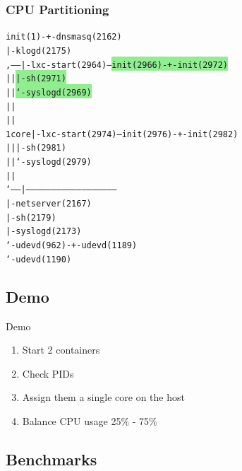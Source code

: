 \begin{frame}[fragile]
\frametitle{CPU Partitioning}
\begin{alltt}\footnotesize
init(1)-+-dnsmasq(2162)
        |-klogd(2175)       
  ,-----|-lxc-start(2964)---\colorbox{LightGreen}{init(2966)-+-init(2972)    }
  |     |                \colorbox{LightGreen}{              |-sh(2971)      }
  |     |                   \colorbox{LightGreen}{              `-syslogd(2969) }
  |     |                   
  |     |                   
1 core  |-lxc-start(2974)---\colorbox{LightRed}{init(2976)-+-init(2982)    }
  |     |                \colorbox{LightRed}{              |-sh(2981)      }
  |     |                   \colorbox{LightRed}{              `-syslogd(2979) }
  |     |                   
  `-----|-----------------------------------------------------
        |-netserver(2167)
        |-sh(2179)
        |-syslogd(2173)
        `-udevd(962)-+-udevd(1189)
                     `-udevd(1190)
\end{alltt}\normalsize
\end{frame}

\subsection{Demo}

\begin{frame}{Demo}
\begin{enumerate}
\item Start 2 containers
\item Check PIDs
\item Assign them a single core on the host
\item Balance CPU usage 25\% - 75\%
\end{enumerate}
\end{frame}

\subsection{Benchmarks}

